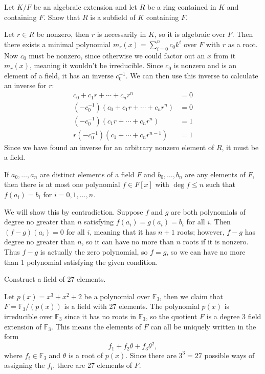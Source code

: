 \documentclass[10pt]{report}
\begin{document}
\begin{exer}[DF 13.2: 16]
Let $K/F$ be an algebraic extension and let $R$ be a ring contained in $K$ and containing $F$. Show that $R$ is a subfield of $K$ containing $F$.
\end{exer}
Let $r \in R$ be nonzero, then $r$ is necessarily in $K$, so it is algebraic over $F$. Then there exists a minimal polynomial $m_r(x) = \sum_{i=0}^{n} c_0 k^i$ over $F$ with $r$ as a root. Now $c_0$ must be nonzero, since otherwise we could factor out an $x$ from it $m_r(x)$, meaning it wouldn't be irreducible. Since $c_0$ is nonzero and is an element of a field, it has an inverse $c_0^{-1}$. We can then use this inverse to calculate an inverse for $r$:
\begin{align*}
	c_0+c_1r+\cdots+c_nr^n &= 0 \\
	(-c_0^{-1})(c_0+c_1r+\cdots+c_nr^n) &= 0 \\
	(-c_0^{-1})(c_1r+\cdots+c_nr^n) &= 1 \\
	r (-c_0^{-1})(c_1+\cdots+c_nr^{n-1}) &= 1
\end{align*}
Since we have found an inverse for an arbitrary nonzero element of $R$, it must be a field.

\begin{exer}[]
	If $a_0, \dots, a_n$ are distinct elements of a field $F$ and $b_0,\dots, b_n$ are any elements of $F$, then there is at most one polynomial $f\in F[x]$ with $\deg f\leq n$ such that $f(a_i) = b_i$ for $i=0, 1, \dots, n$.
\end{exer}
We will show this by contradiction. Suppose $f$ and $g$ are both polynomials of degree no greater than $n$ satisfying $f(a_i)=g(a_i)=b_i$ for all $i$. Then $(f-g)(a_i)=0$ for all $i$, meaning that it has $n+1$ roots; however, $f-g$ has degree no greater than $n$, so it can have no more than $n$ roots if it is nonzero. Thus $f-g$ is actually the zero polynomial, so $f=g$, so we can have no more than 1 polynomial satisfying the given condition.

\begin{exer}[]
	Construct a field of 27 elements.
\end{exer}
Let $p(x)=x^3+x^2+2$ be a polynomial over $\mathbb{F}_3$, then we claim that $F = \mathbb{F}_3/(p(x))$ is a field with 27 elements. The polynomial $p(x)$ is irreducible over $\mathbb{F}_3$ since it has no roots in $\mathbb{F}_3$, so the quotient $F$ is a degree 3 field extension of $\mathbb{F}_3$. This means the elements of $F$ can all be uniquely written in the form
\[
f_1 + f_2\theta + f_3\theta^2,
\] where $f_i \in \mathbb{F}_3$ and $\theta$ is a root of $p(x)$. Since there are $3^3=27$ possible ways of assigning the $f_i$, there are 27 elements of $F$.
\end{document}
